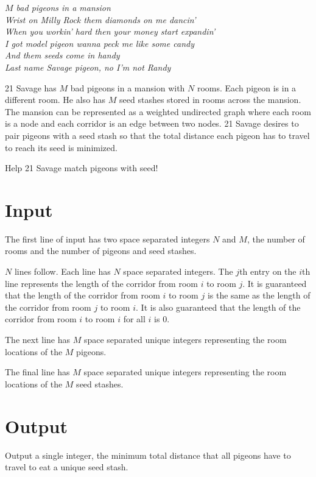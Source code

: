 
\begin{center}
\textit{
$M$ bad pigeons in a mansion \\
Wrist on Milly Rock them diamonds on me dancin' \\
When you workin' hard then your money start expandin' \\
I got model pigeon wanna peck me like some candy \\
And them seeds come in handy \\
Last name Savage pigeon, no I'm not Randy \\
}
\end{center}

21 Savage has $M$ bad pigeons in a mansion with $N$ rooms. Each pigeon
is in a different room. He also has $M$ seed stashes stored in rooms across
the mansion. The mansion can be represented as a weighted undirected graph
where each room is a node and each corridor is an edge between two nodes. 21
Savage desires to pair pigeons with a seed stash so that the total distance
each pigeon has to travel to reach its seed is minimized.

\medskip

Help 21 Savage match pigeons with seed!

\section*{Input}

The first line of input has two space separated integers $N$ and $M$, the
number of rooms and the number of pigeons and seed stashes.

$N$ lines follow. Each line has $N$ space separated integers. The $j$th entry
on the $i$th line represents the length of the corridor from room $i$ to room
$j$. It is guaranteed that the length of the corridor from room $i$ to room
$j$ is the same as the length of the corridor from room $j$ to room $i$. It
is also guaranteed that the length of the corridor from room $i$ to room $i$
for all $i$ is $0$.

The next line has $M$ space separated unique integers representing the room
locations of the $M$ pigeons.

The final line has $M$ space separated unique integers representing the room
locations of the $M$ seed stashes.

\section*{Output}

Output a single integer, the minimum total distance that all pigeons have to
travel to eat a unique seed stash.
